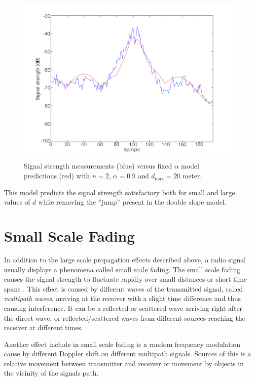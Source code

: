 \documentclass{LTHthesis}
\begin{document}
 \begin{figure}[!hbt]

\includegraphics[width=1\textwidth ]{images/signal_model/fixed_alpha}
\caption{Signal strength measurements (blue) versus fixed $\alpha$ model predictions (red) with $n=2$, $\alpha=0.9$ and $d_{\text{max}}=20$ meter.}\label{fixed_alpha}
\end{figure}

This model predicts the signal strength satisfactory both for small and large values of $d$ while removing the ''jump'' present in the double slope model.
 \section{Small Scale Fading}
In addition to the large scale propagation effects described above, a radio signal usually displays a phenomena called small scale fading. The small scale fading causes the signal strength to fluctuate rapidly over small distances or short time-spans \cite{rappaport96}. This effect is caused by different waves of the transmitted signal, called \emph{multipath waves}, arriving at the receiver with a slight time difference and thus causing interference. It can be a reflected or scattered wave arriving right after the direct wave, or reflected/scattered waves from different sources reaching the receiver at different times. 

Another effect include in small scale fading is a random frequency modulation cause by different Doppler shift on different multipath signals. Sources of this is a relative movement between transmitter and receiver or movement by objects in the vicinity of the signals path. 
\end{document}
